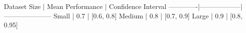 Dataset Size | Mean Performance | Confidence Interval
-------------|------------------|---------------------
Small        | 0.7              | [0.6, 0.8]
Medium       | 0.8              | [0.7, 0.9]
Large        | 0.9              | [0.8, 0.95]